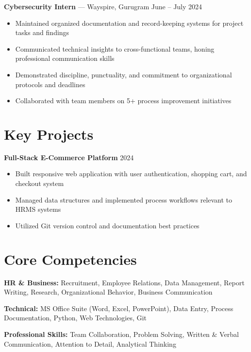 \documentclass[10pt, a4paper]{article}
\begin{document}
\noindent\textbf{Cybersecurity Intern} — Wayspire, Gurugram \hfill June – July 2024
\begin{itemize}
  \item Maintained organized documentation and record-keeping systems for project tasks and findings
  \item Communicated technical insights to cross-functional teams, honing professional communication skills
  \item Demonstrated discipline, punctuality, and commitment to organizational protocols and deadlines
  \item Collaborated with team members on 5+ process improvement initiatives
\end{itemize}

\vspace{6pt}

\section{Key Projects}

\noindent\textbf{Full-Stack E-Commerce Platform} \hfill 2024
\begin{itemize}
  \item Built responsive web application with user authentication, shopping cart, and checkout system
  \item Managed data structures and implemented process workflows relevant to HRMS systems
  \item Utilized Git version control and documentation best practices
\end{itemize}

\vspace{6pt}

\section{Core Competencies}

\noindent\textbf{HR \& Business:} Recruitment, Employee Relations, Data Management, Report Writing, Research, Organizational Behavior, Business Communication

\noindent\textbf{Technical:} MS Office Suite (Word, Excel, PowerPoint), Data Entry, Process Documentation, Python, Web Technologies, Git

\noindent\textbf{Professional Skills:} Team Collaboration, Problem Solving, Written \& Verbal Communication, Attention to Detail, Analytical Thinking
\end{document}
